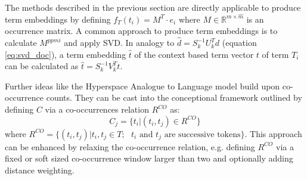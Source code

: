 The methods described in the previous section are directly applicable to produce term embeddings by defining $f_T(t_i) = M^T \cdot e_i$ where $M \in \mathbb{R}^{m \times \hat{m}}$ is an occurrence matrix. A common approach to produce term embeddings is to calculate $M^{ppmi}$ and apply \ac{SVD}. In analogy to $\hat{d} = S_k^{-1}U_k^Td$ (equation \eqref{eq:svd_doc}), a term embedding $\hat{t}$ of the context based term vector $t$ of term $T_i$ can be calculated as $\hat{t} = S_k^{-1}V_k^Tt$.

Further ideas like the Hyperspace Analogue to Language model \autocite{lund_producing_1996} build upon co-occurrence counts. They can be cast into the conceptional framework outlined by defining $C$ via a co-occurrences relation $R^{CO}$ as:%
\begin{equation} \label{eq:co}
C_j = \{t_i|(t_i, t_j) \in R^{CO}\}
\end{equation}
where $R^{CO} = \{(t_i, t_j)|t_i, t_j \in T; \text{ $t_i$ and $t_j$ are successive tokens}\}$. This approach can be enhanced by relaxing the co-occurrence relation, e.g. defining $R^{CO}$ via a fixed or soft sized co-occurrence window larger than two and optionally adding distance weighting.

